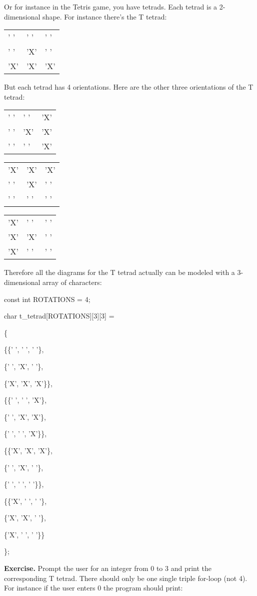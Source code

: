 \documentclass[
]{article}
\begin{document}
Or for instance in the Tetris game, you have tetrads. Each tetrad is a
2-dimensional shape. For instance there's the T tetrad:

\begin{longtable}[]{@{}lll@{}}
\toprule
\endhead
' ' & ' ' & ' '\tabularnewline
' ' & 'X' & ' '\tabularnewline
'X' & 'X' & 'X'\tabularnewline
\bottomrule
\end{longtable}

But each tetrad has 4 orientations. Here are the other three
orientations of the T tetrad:

\begin{longtable}[]{@{}lll@{}}
\toprule
\endhead
' ' & ' ' & 'X'\tabularnewline
' ' & 'X' & 'X'\tabularnewline
' ' & ' ' & 'X'\tabularnewline
\bottomrule
\end{longtable}

\begin{longtable}[]{@{}lll@{}}
\toprule
\endhead
'X' & 'X' & 'X'\tabularnewline
' ' & 'X' & ' '\tabularnewline
' ' & ' ' & ' '\tabularnewline
\bottomrule
\end{longtable}

\begin{longtable}[]{@{}lll@{}}
\toprule
\endhead
'X' & ' ' & ' '\tabularnewline
'X' & 'X' & ' '\tabularnewline
'X' & ' ' & ' '\tabularnewline
\bottomrule
\end{longtable}

Therefore all the diagrams for the T tetrad actually can be modeled with
a 3-dimensional array of characters:

const int ROTATIONS = 4;

char t\_tetrad{[}ROTATIONS{]}{[}3{]}{[}3{]} =

\{

\{\{' ', ' ', ' '\},

\{' ', 'X', ' '\},

\{'X', 'X', 'X'\}\},

\{\{' ', ' ', 'X'\},

\{' ', 'X', 'X'\},

\{' ', ' ', 'X'\}\},

\{\{'X', 'X', 'X'\},

\{' ', 'X', ' '\},

\{' ', ' ', ' '\}\},

\{\{'X', ' ', ' '\},

\{'X', 'X', ' '\},

\{'X', ' ', ' '\}\}

\};

\textbf{Exercise.} Prompt the user for an integer from 0 to 3 and print
the corresponding T tetrad. There should only be one single triple
for-loop (not 4). For instance if the user enters 0 the program should
print:
\end{document}
